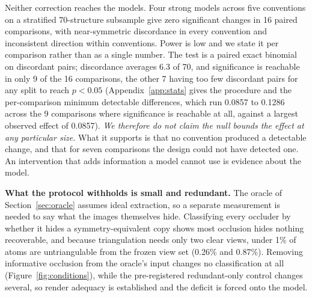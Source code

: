 Neither correction reaches the models. Four strong models across five conventions on a stratified
70-structure subsample give zero significant changes in 16 paired comparisons, with near-symmetric
discordance in every convention and inconsistent direction within conventions. Power is low and we state it
per comparison rather than as a single number. The test is a paired exact binomial on discordant pairs;
discordance averages 6.3 of 70, and significance is reachable in only 9 of the 16 comparisons, the other 7
having too few discordant pairs for any split to reach $p<0.05$ (Appendix~\ref{app:stats} gives the
procedure and the per-comparison minimum detectable differences, which run 0.0857 to 0.1286 across the 9
comparisons where significance is reachable at all, against a largest observed effect of 0.0857). \emph{We therefore do not claim the null bounds the effect at any
particular size.} What it supports is that no convention produced a detectable change, and that for seven
comparisons the design could not have detected one. An intervention that adds information a model cannot
use is evidence about the model.

\textbf{What the protocol withholds is small and redundant.} The oracle of Section~\ref{sec:oracle} assumes
ideal extraction, so a separate measurement is needed to say what the images themselves hide. Classifying
every occluder by whether it hides a symmetry-equivalent copy shows most occlusion hides nothing
recoverable, and because triangulation needs only two clear views, under 1\% of atoms are untriangulable
from the frozen view set (0.26\% and 0.87\%).
Removing informative occlusion from the oracle's input changes no classification at all
(Figure~\ref{fig:conditions}), while the pre-registered redundant-only control changes several, so render
adequacy is established and the deficit is forced onto the model.
